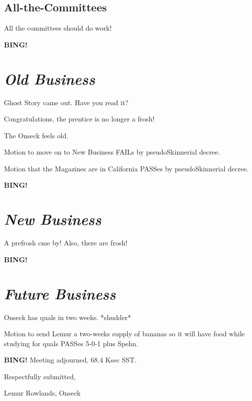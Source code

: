 \documentclass[10pt]{article}
\newcommand{\bing}{{\bf BING!} }
\newcommand{\goto}[1]{\bing \vskip 12pt \section*{{\em{#1}}}}
\newcommand{\ps}{ plus Spehn\xspace}
\newcommand{\onseck}{Lemur Rowlands, Onseck}
\begin{document}
\subsection*{All-the-Committees}

All the committees should do work!



\goto{Old Business}

Ghost Story came out.  Have you read it?

Congratulations, the prentice is no longer a frosh!

The Onseck feels old.

Motion to move on to New Business FAILs by pseudoSkinnerial decree.

Motion that the Magazines are in California PASSes by pseudoSkinnerial
decree.


\goto{New Business}

A prefrosh cme by!  Also, there are frosh!


\goto{Future Business}

Onseck has quals in two weeks.  *shudder*

Motion to send Lemur a two-weeks supply of bananas so it will have 
food while studying for quals PASSes 5-0-1\ps.

\bing
\noindent
Meeting adjourned, 68.4 Ksec SST.

\vspace{18pt}

\centerline{Respectfully submitted,}
\centerline{\onseck}
\end{document}

